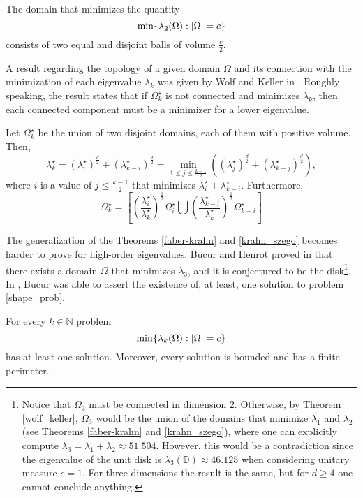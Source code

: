 \begin{theorem}\label{krahn_szego}
    The domain that minimizes the quantity
    \[
    \min\{\lambda_2(\Omega): \abs{\Omega} = c\}
    \]
    consists of two equal and disjoint balls of volume \(\frac{c}{2}\).
\end{theorem}

A result regarding the topology of a given domain \(\Omega\) and its connection with the minimization of each eigenvalue \(\lambda_k\) was given by Wolf and Keller in \cite{wolf1994range}. Roughly speaking, the result states that if \(\Omega_k^\star\) is not connected and minimizes \(\lambda_k\), then each connected component must be a minimizer for a lower eigenvalue.
\begin{theorem}\label{wolf_keller}
    Let \(\Omega_k^\star\) be the union of two disjoint domains, each of them with positive volume. Then,
    \[
        \lambda_k^\star = (\lambda_i^\star)^\frac{d}{2} + (\lambda_{k-i}^\star)^\frac{d}{2} = \min_{1 \leq j \leq \frac{k-1}{2}}((\lambda_j^\star)^\frac{d}{2} + (\lambda_{k-j}^\star)^\frac{d}{2}),
    \]
    where \(i\) is a value of \(j \leq \frac{k-1}{2}\) that minimizes \(\lambda_i^\star + \lambda_{k-i}^\star\). Furthermore,
    \[
        \Omega_k^\star = \left[\left(\frac{\lambda_i^\star}{\lambda_k^\star}\right)^\frac{1}{2} \Omega_i^\star \bigcup \left(\frac{\lambda_{k-i}^\star}{\lambda_k^\star}\right)^\frac{1}{2} \Omega_{k-i}^\star \right]
    \]
\end{theorem}

The generalization of the Theorems \eqref{faber-krahn} and \eqref{krahn_szego} becomes harder to prove for high-order eigenvalues. Bucur and Henrot proved in \cite{henrot2000minimization} that there exists a domain \(\Omega\) that minimizes \(\lambda_3\), and it is conjectured to be the disk\footnote{Notice that \(\Omega_3\) must be connected in dimension \(2\). Otherwise, by Theorem \ref{wolf_keller}, \(\Omega_3\) would be the union of the domains that minimize \(\lambda_1\) and \(\lambda_2\) (see Theorems \eqref{faber-krahn} and \eqref{krahn_szego}), where one can explicitly compute \(\lambda_3 = \lambda_1 + \lambda_2 \approx 51.504\). However, this would be a contradiction since the eigenvalue of the unit disk is \(\lambda_3(\mathbb{D}) \approx 46.125\) when considering unitary measure \(c=1\). For three dimensions the result is the same, but for \(d \geq 4\) one cannot conclude anything.}.
In \cite{bucur2012minimization}, Bucur was able to assert the existence of, at least, one solution to problem \eqref{shape_prob}.
\begin{theorem}[Bucur]
    For every \(k \in \mathbb{N}\) problem
    \[
    \min\{\lambda_k(\Omega): \abs{\Omega} = c\}
    \]
    has at least one solution. Moreover, every solution is bounded and has a finite perimeter.
\end{theorem}

